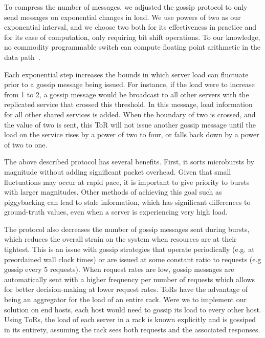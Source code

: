 To compress the number of messages, we adjusted the gossip protocol to only
send messages on exponential changes in load. We use powers of two as our
exponential interval, and we choose two both for its effectiveness in practice
and for its ease of computation, only requiring bit shift operations. To our
knowledge, no commodity programmable switch can compute floating point
arithmetic in the data path~\cite{challenging_programable}.

Each exponential step increases the bounds in which server load can fluctuate
prior to a gossip message being issued. For instance, if the load were to
increase from 1 to 2, a gossip message would be broadcast to all other servers
with the replicated service that crossed this threshold. In this message, load
information for all other shared services is added. When the boundary of two is
crossed, and the value of two is sent, this ToR will not issue another gossip
message until the load on the service rises by a power of two to four, or falls
back down by a power of two to one.

The above described protocol has several benefits. First, it sorts microbursts
by magnitude without adding significant packet overhead. Given that small
fluctuations may occur at rapid pace, it is important to give priority to
bursts with larger magnitudes. Other methods of achieving this goal such as
piggybacking can lead to stale information, which has significant differences
to ground-truth values, even when a server is experiencing very
high load.


The protocol also decreases the number of gossip messages sent during 
bursts, which reduces the overall strain on the system when resources
are at their tightest. This is an issue with gossip strategies that
operate periodically (e.g. at preordained wall clock times)
or are issued at some constant ratio
to requests (e.g gossip every 5 requests).  When request rates
are low, gossip messages are automatically sent with a higher frequency
per number of requests which allows for better decision-making at lower
request rates.
ToRs have the advantage of being an aggregator for the load of an
entire rack. Were we to implement our solution on end hosts, each host
would need to gossip its load to every other host. Using ToRs, the load of
each server in a rack is known explicitly and is gossiped in its
entirety, assuming the rack sees both requests and the associated
responses.

